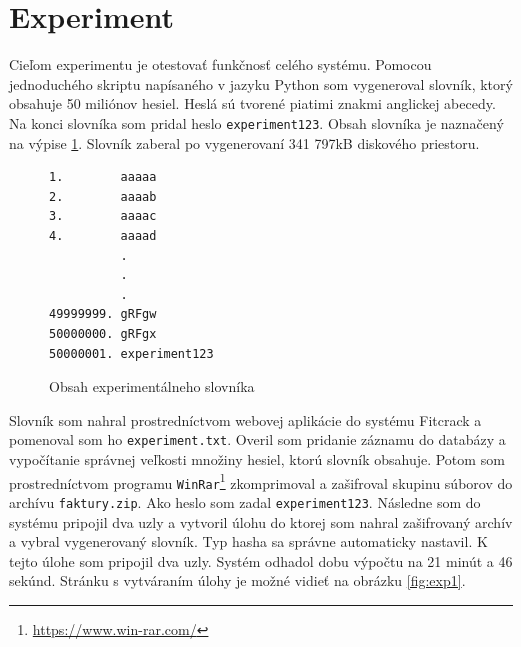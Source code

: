 \documentclass[slovak]{fitthesis}
\begin{document}
\section{Experiment}
Cieľom experimentu je otestovať funkčnosť celého systému. Pomocou jednoduchého skriptu napísaného v jazyku Python som vygeneroval slovník, ktorý obsahuje 50 miliónov hesiel. Heslá sú tvorené piatimi znakmi anglickej abecedy. Na konci slovníka som pridal heslo \texttt{experiment123}. Obsah slovníka je naznačený na výpise \ref{lst:experimentDict}. Slovník zaberal po vygenerovaní 341 797kB diskového priestoru.
\begin{figure}[H]
\begin{center}
\begin{varwidth}{\linewidth}
\begin{verbatim}
1.        aaaaa
2.        aaaab
3.        aaaac
4.        aaaad
          .
          .
          .
49999999. gRFgw
50000000. gRFgx
50000001. experiment123
\end{verbatim}
\end{varwidth}
\end{center}
\caption{Obsah experimentálneho slovníka}
\label{lst:experimentDict}
\end{figure}
Slovník som nahral prostredníctvom webovej aplikácie do systému Fitcrack a pomenoval som ho \texttt{experiment.txt}. Overil som pridanie záznamu do databázy a vypočítanie správnej veľkosti množiny hesiel, ktorú slovník obsahuje. Potom som prostredníctvom programu \texttt{WinRar}\footnote{\url{https://www.win-rar.com/}} zkomprimoval a zašifroval skupinu súborov do archívu \texttt{faktury.zip}. Ako heslo som zadal \texttt{experiment123}. Následne som do systému pripojil dva uzly a vytvoril úlohu do ktorej som nahral zašifrovaný archív a vybral vygenerovaný slovník. Typ hasha sa správne automaticky nastavil. K tejto úlohe som pripojil dva uzly. Systém odhadol dobu výpočtu na 21 minút a 46 sekúnd. Stránku s vytváraním úlohy je možné vidieť na obrázku \ref{fig:exp1}. 
\end{document}
